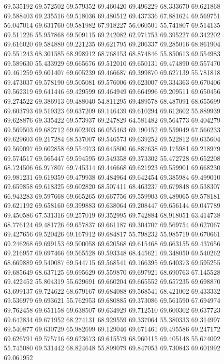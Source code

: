 69.535192
69.572502
69.579352
69.460420
69.496229
68.333670
69.621868
69.588403
69.235516
69.518036
69.480512
69.437336
67.881624
69.569751
56.047014
69.631760
69.581982
67.918227
56.060501
55.741807
69.514135
69.511226
55.957868
69.509115
69.242082
62.971753
69.395227
69.342202
69.616020
69.584880
69.221235
69.621795
69.206337
69.285016
68.861904
69.551243
68.301585
68.998912
68.768153
68.874846
55.850613
69.554983
69.589630
55.433929
69.665676
69.512010
69.650131
69.474890
69.557470
69.461259
69.601407
69.605239
69.466687
69.399870
69.627139
55.781818
69.473037
69.578190
69.505081
69.576006
69.623007
69.334363
69.670406
69.562319
69.641446
69.429599
69.464949
69.664996
69.209511
69.650456
69.274522
69.386913
69.488040
54.811295
69.489578
68.487091
68.655699
69.603793
69.519323
69.637209
69.146439
69.610294
69.612602
55.889939
69.628876
69.335422
69.573937
69.247829
64.581482
69.564773
69.404279
69.569503
69.682712
69.602303
66.055463
69.190152
69.559049
67.566233
69.629603
69.217284
68.537007
69.546573
69.639252
69.522812
69.635604
69.569097
69.602858
69.554973
69.645800
66.887638
69.175981
69.218979
69.574517
69.565447
69.594595
69.549358
69.373302
55.472728
69.652208
68.724506
66.977807
69.745314
69.446668
69.621923
69.559901
69.668230
69.981231
69.619359
69.479938
69.484964
69.642454
69.385984
69.499010
69.659858
69.618325
69.602820
68.507411
68.463237
69.679848
69.538307
66.943283
69.597668
69.665265
69.667756
69.559903
69.489065
69.578181
69.621192
69.658160
69.399883
69.638064
69.208447
69.656144
69.047789
69.450586
67.531316
69.257019
69.352995
69.742884
68.918051
63.414738
68.776124
69.481726
69.657837
69.661187
69.304707
69.569754
69.627067
69.427656
69.520426
69.167912
69.684817
55.798232
55.985719
69.670661
69.246268
69.699153
69.500058
69.620568
69.615468
69.663155
69.437656
69.216957
69.697466
69.565528
69.593348
68.445621
69.348050
69.540262
68.669889
69.540087
69.544715
69.568541
69.166395
69.640373
69.595255
69.685649
68.637125
69.695629
69.559870
69.697921
68.690763
67.145528
69.422452
55.804319
55.629691
69.660204
69.665552
69.657235
69.698870
63.699137
69.724622
68.679167
69.684088
69.568541
68.421002
69.433332
69.536979
69.693621
55.762953
69.680885
69.373086
69.561590
67.694974
69.762458
69.651158
69.638507
69.634929
69.712510
69.600302
69.637723
69.642834
69.671952
68.274131
68.929559
69.337064
55.380333
69.314997
69.540877
69.630729
65.982699
69.129046
69.671461
69.495586
69.247172
69.626791
69.575716
69.623673
69.615579
68.960115
69.405148
55.674092
55.745080
69.531442
68.824648
55.899079
69.847053
69.730843
69.601992
69.061952
